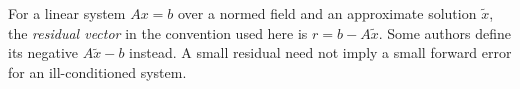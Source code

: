 
For a linear system $Ax=b$ over a normed field and an approximate solution $\widetilde x$, the \emph{residual vector} in the convention used here is $r=b-A\widetilde x$. Some authors define its negative $A\widetilde x-b$ instead. A small residual need not imply a small forward error for an ill-conditioned system.

